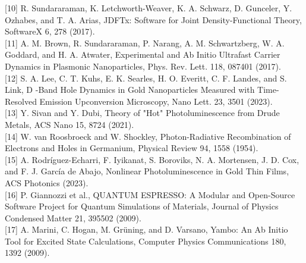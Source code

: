 \documentclass[10pt]{article}
\begin{document}
[10] R. Sundararaman, K. Letchworth-Weaver, K. A. Schwarz, D. Gunceler, Y. Ozhabes, and T. A. Arias, JDFTx: Software for Joint Density-Functional Theory, SoftwareX 6, 278 (2017).\\[0pt]
[11] A. M. Brown, R. Sundararaman, P. Narang, A. M. Schwartzberg, W. A. Goddard, and H. A. Atwater, Experimental and Ab Initio Ultrafast Carrier Dynamics in Plasmonic Nanoparticles, Phys. Rev. Lett. 118, 087401 (2017).\\[0pt]
[12] S. A. Lee, C. T. Kuhs, E. K. Searles, H. O. Everitt, C. F. Landes, and S. Link, D -Band Hole Dynamics in Gold Nanoparticles Measured with Time-Resolved Emission Upconversion Microscopy, Nano Lett. 23, 3501 (2023).\\[0pt]
[13] Y. Sivan and Y. Dubi, Theory of "Hot" Photoluminescence from Drude Metals, ACS Nano 15, 8724 (2021).\\[0pt]
[14] W. van Roosbroeck and W. Shockley, Photon-Radiative Recombination of Electrons and Holes in Germanium, Physical Review 94, 1558 (1954).\\[0pt]
[15] A. Rodríguez-Echarri, F. Iyikanat, S. Boroviks, N. A. Mortensen, J. D. Cox, and F. J. García de Abajo, Nonlinear Photoluminescence in Gold Thin Films, ACS Photonics (2023).\\[0pt]
[16] P. Giannozzi et al., QUANTUM ESPRESSO: A Modular and Open-Source Software Project for Quantum Simulations of Materials, Journal of Physics Condensed Matter 21, 395502 (2009).\\[0pt]
[17] A. Marini, C. Hogan, M. Grüning, and D. Varsano, Yambo: An Ab Initio Tool for Excited State Calculations, Computer Physics Communications 180, 1392 (2009).
\end{document}
